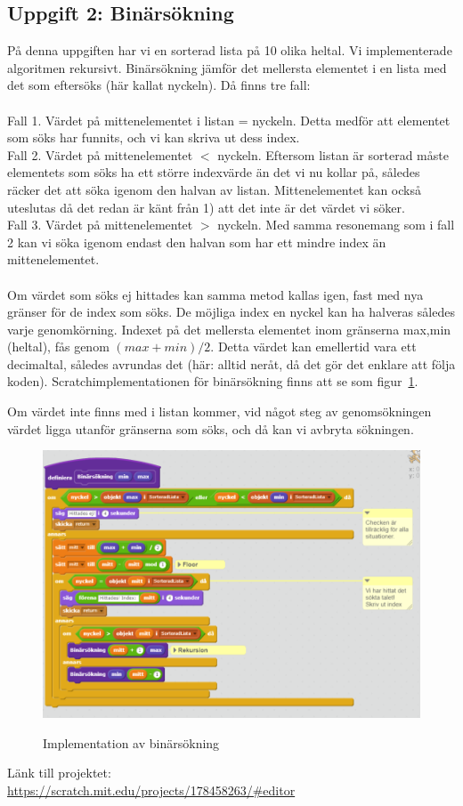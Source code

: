 \documentclass[12pt,a4paper]{article}
\begin{document}
\subsection{Uppgift 2: Binärsökning}
På denna uppgiften har vi en sorterad lista på 10 olika heltal.
Vi implementerade algoritmen rekursivt. Binärsökning jämför det mellersta elementet i en lista med det som eftersöks (här kallat nyckeln). Då finns tre fall:    \\ \\
Fall 1. Värdet på mittenelementet i listan = nyckeln. Detta medför att elementet som söks har funnits, och vi kan skriva ut dess index.  \\
Fall 2. Värdet på mittenelementet $<$ nyckeln. Eftersom listan är sorterad måste elementets som söks ha ett större indexvärde än det vi nu kollar på, således räcker det att söka igenom den halvan av listan. Mittenelementet kan också uteslutas då det redan är känt från 1) att det inte är det värdet vi söker. \\
Fall 3. Värdet på mittenelementet $>$ nyckeln. Med samma resonemang som i fall 2 kan vi söka igenom endast den halvan som har ett mindre index än mittenelementet.\\ \\
Om värdet som söks ej hittades kan samma metod kallas igen, fast med nya gränser för de index som söks. De möjliga index en nyckel kan ha halveras således varje genomkörning. Indexet på det mellersta elementet inom gränserna max,min (heltal), fås genom  $(max + min)/2$. Detta värdet kan emellertid vara ett decimaltal, således avrundas det (här: alltid neråt, då det gör det enklare att följa koden). Scratchimplementationen för binärsökning finns att se som figur~\ref{fig2:binsearch}.

Om värdet inte finns med i listan kommer, vid något steg av genomsökningen värdet ligga utanför gränserna som söks, och då kan vi avbryta sökningen. 
\begin{figure}[H]
	\caption{Implementation av binärsökning}
	\includegraphics[scale=0.65]{binaryimpl}
	\label{fig2:binsearch}
\end{figure}
Länk till projektet: \\ \url{ https://scratch.mit.edu/projects/178458263/#editor } 
\end{document}
